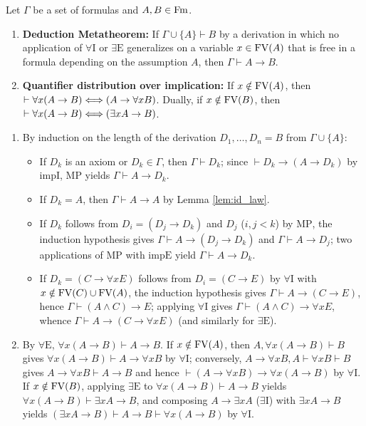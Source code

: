 \documentclass[10pt,a4paper]{article}
\begin{document}
\begin{theorem}\label{thm:deduction}
Let $\Gamma$ be a set of formulas and $A, B \in {\textrm{Fm}}$.
\begin{enumerate}
\item \textbf{Deduction Metatheorem:} If $\Gamma \cup \{A\} \vdash B$ by a derivation in which no application of $\forall\textrm{I}$ or $\exists\textrm{E}$ generalizes on a variable $x \in {\textrm{FV}}(A)$ that is free in a formula depending on the assumption $A$, then $\Gamma \vdash A \to B$.
\item \textbf{Quantifier distribution over implication:} If $x \notin {\textrm{FV}}(A)$, then $\vdash \forall x (A \to B) \Longleftrightarrow (A \to \forall x B)$. Dually, if $x \notin {\textrm{FV}}(B)$, then $\vdash \forall x (A \to B) \Longleftrightarrow (\exists x A \to B)$.
\end{enumerate}
\end{theorem}
\myprf
\begin{enumerate}
\item By induction on the length of the derivation $D_1, \dots, D_n = B$ from $\Gamma \cup \{A\}$:
  \begin{itemize}
  \item If $D_k$ is an axiom or $D_k \in \Gamma$, then $\Gamma \vdash D_k$; since $\vdash D_k \to (A \to D_k)$ by $\textrm{impI}$, $\textrm{MP}$ yields $\Gamma \vdash A \to D_k$.
  \item If $D_k = A$, then $\Gamma \vdash A \to A$ by Lemma \ref{lem:id_law}.
  \item If $D_k$ follows from $D_i = (D_j \to D_k)$ and $D_j$ ($i, j < k$) by $\textrm{MP}$, the induction hypothesis gives $\Gamma \vdash A \to (D_j \to D_k)$ and $\Gamma \vdash A \to D_j$; two applications of $\textrm{MP}$ with $\textrm{impE}$ yield $\Gamma \vdash A \to D_k$.
  \item If $D_k = (C \to \forall x E)$ follows from $D_i = (C \to E)$ by $\forall\textrm{I}$ with $x \notin {\textrm{FV}}(C) \cup {\textrm{FV}}(A)$, the induction hypothesis gives $\Gamma \vdash A \to (C \to E)$, hence $\Gamma \vdash (A \land C) \to E$; applying $\forall\textrm{I}$ gives $\Gamma \vdash (A \land C) \to \forall x E$, whence $\Gamma \vdash A \to (C \to \forall x E)$ (and similarly for $\exists\textrm{E}$).
  \end{itemize}
\item By $\forall\textrm{E}$, $\forall x (A \to B) \vdash A \to B$. If $x \notin {\textrm{FV}}(A)$, then $A, \forall x (A \to B) \vdash B$ gives $\forall x(A \to B) \vdash A \to \forall x B$ by $\forall\textrm{I}$; conversely, $A \to \forall x B, A \vdash \forall x B \vdash B$ gives $A \to \forall x B \vdash A \to B$ and hence $\vdash (A \to \forall x B) \to \forall x (A \to B)$ by $\forall\textrm{I}$. If $x \notin {\textrm{FV}}(B)$, applying $\exists\textrm{E}$ to $\forall x(A \to B) \vdash A \to B$ yields $\forall x(A \to B) \vdash \exists x A \to B$, and composing $A \to \exists x A$ ($\exists\textrm{I}$) with $\exists x A \to B$ yields $(\exists x A \to B) \vdash A \to B \vdash \forall x (A \to B)$ by $\forall\textrm{I}$.
\end{enumerate}
\myqed
\end{document}
